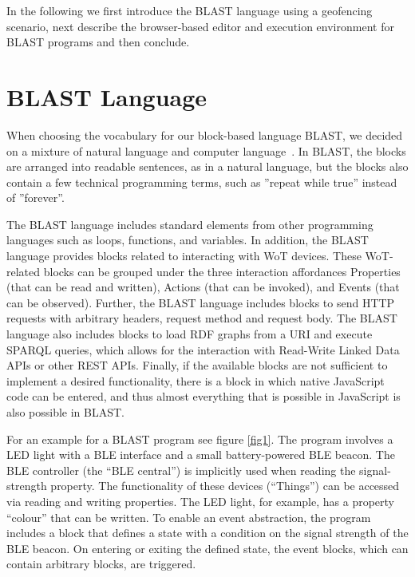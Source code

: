 \documentclass[runningheads]{llncs}
\begin{document}
In the following we first introduce the BLAST language using a geofencing scenario, next describe the browser-based editor and execution environment for BLAST programs and then conclude.

\section{BLAST Language}

When choosing the vocabulary for our block-based language BLAST, we decided on a mixture of natural language and computer language~\cite{8120404}.
In BLAST, the blocks are arranged into readable sentences, as in a natural language, but the blocks also contain a few technical programming terms, such as ''repeat while true'' instead of ''forever''.

The BLAST language includes standard elements from other programming languages such as loops, functions, and variables.
In addition, the BLAST language provides blocks related to interacting with WoT devices.
These WoT-related blocks can be grouped under the three interaction affordances Properties (that can be read and written), Actions (that can be invoked), and Events (that can be observed).
Further, the BLAST language includes blocks to send HTTP requests with arbitrary headers, request method and request body.
The BLAST language also includes blocks to load RDF graphs from a URI and execute SPARQL queries, which allows for the interaction with Read-Write Linked Data APIs or other REST APIs.
Finally, if the available blocks are not sufficient to implement a desired functionality, there is a block in which native JavaScript code can be entered, and thus almost everything that is possible in JavaScript is also possible in BLAST.

For an example for a BLAST program see figure \ref{fig1}.
The program involves a LED light with a BLE interface and a small battery-powered BLE beacon.
The BLE controller (the ``BLE central'') is implicitly used when reading the signal-strength property.
The functionality of these devices (``Things'') can be accessed via reading and writing properties.
The LED light, for example, has a property ``colour'' that can be written.
To enable an event abstraction, the program includes a block that defines a state with a condition on the signal strength of the BLE beacon.
On entering or exiting the defined state, the event blocks, which can contain arbitrary blocks, are triggered.
\end{document}
